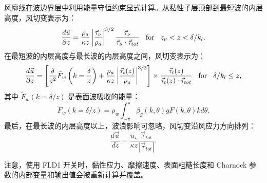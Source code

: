 风廓线在波边界层中利用能量守恒约束显式计算。从黏性子层顶部到最短波的内层高度，风切变表示为：
\begin{equation}
\frac{d {\vec{u}}}{\partial z}=\frac{\rho_a}{\kappa z}\left|\frac{ \vec{\tau}_\nu}{\rho_a}\right|^{3/2}\frac{\vec{\tau}_\nu}{\vec{\tau}_\nu\cdot\vec{\tau}_{tot}}\hspace{3mm}{\rm for}\hspace{3mm}z_\nu<z<\delta/k_l.
\end{equation}
在最短波的内层高度与最长波的内层高度之间，风切变表示为：
\begin{equation}
\frac{d {\vec{u}}}{\partial z}=\left[ \frac{\delta}{z^2}\tilde{F}_w\left(k=\frac{\delta}{z}\right)+\frac{\rho_a}{\kappa z}\left| \frac{\vec{\tau}_t(z)}{\rho_a}\right|^{3/2} \right]\times\frac{\vec{\tau}_t(z)}{\vec{\tau}_t(z)\cdot\vec{\tau}_{tot}}\hspace{3mm}{\rm for}\hspace{3mm}\delta/k_l\le z,
\end{equation}
其中 $\tilde{F}_w(k=\delta/z)$ 是表面波吸收的能量：
\begin{equation}
\tilde{F}_w(k=\delta/z)=\rho_w\int^{\pi}_{-\pi}\beta_g(k,\theta)gF(k,\theta)k d\theta.
\end{equation}
最后，在最长波的内层高度以上，波浪影响可忽略，风切变沿风应力方向排列：
\begin{equation}
\frac{d{\vec{u}}}{dz}=\frac{u_\star}{\kappa z}\frac{\vec{\tau}_{tot}}{|\vec{\tau}_{tot}|}.
\end{equation}

注意，使用 FLD1 开关时，黏性应力、摩擦速度、表面粗糙长度和 Charnock 参数的内部变量和输出值会被重新计算并覆盖。
